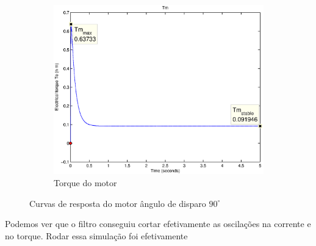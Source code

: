 \documentclass{article}
\begin{document}
\begin{figure}[H]
\begin{subfigure}[b]{0.49\linewidth}
		\includegraphics[width=\linewidth]{matlab/tm7}
		\caption{Torque do motor}
	\end{subfigure}
	\caption{Curvas de resposta do motor ângulo de disparo $90^\circ$}
	\label{fig:res7}
\end{figure}
Podemos ver que o filtro conseguiu cortar efetivamente as oscilações na corrente e no torque. Rodar essa simulação foi efetivamente 


\end{document}
